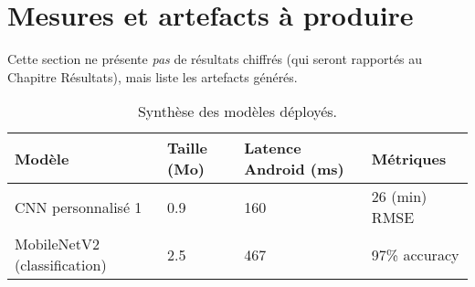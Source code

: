 


\section{Mesures et artefacts à produire}
\label{sec:mesures_artefacts}

Cette section ne présente \emph{pas} de résultats chiffrés (qui seront rapportés au Chapitre Résultats), mais liste les artefacts générés.

\begin{table}[h!]
	\centering
	\caption{Synthèse des modèles déployés.}
	\begin{tabular}{l l l l}
		\toprule
		Modèle                       & Taille (Mo) & Latence Android (ms) & Métriques     \\ \midrule
		CNN personnalisé 1           & 0.9         & 160                  & 26 (min) RMSE \\
		MobileNetV2 (classification) & 2.5         & 467                  & 97\% accuracy \\ \bottomrule
	\end{tabular}
\end{table}

